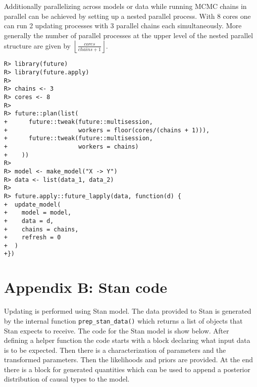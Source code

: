 \documentclass[
  11pt,
  article]{jss}
\begin{document}
Additionally parallelizing across models or data while running MCMC
chains in parallel can be achieved by setting up a nested parallel
process. With 8 cores one can run 2 updating processes with 3 parallel
chains each simultaneously. More generally the number of parallel
processes at the upper level of the nested parallel structure are given
by \(\left \lfloor \frac{cores}{chains + 1} \right \rfloor\).

\begin{verbatim}
R> library(future)
R> library(future.apply)
R> 
R> chains <- 3
R> cores <- 8
R> 
R> future::plan(list(
+      future::tweak(future::multisession, 
+                    workers = floor(cores/(chains + 1))),
+      future::tweak(future::multisession, 
+                    workers = chains)
+    ))
R> 
R> model <- make_model("X -> Y")
R> data <- list(data_1, data_2)
R> 
R> future.apply::future_lapply(data, function(d) {
+  update_model(
+    model = model,
+    data = d,
+    chains = chains,
+    refresh = 0
+  )
+})
\end{verbatim}

\hypertarget{sec-stancode}{%
\section*{Appendix B: Stan code}\label{sec-stancode}}

Updating is performed using Stan model. The data provided to Stan is
generated by the internal function \texttt{prep\_stan\_data()} which
returns a list of objects that Stan expects to receive. The code for the
Stan model is show below. After defining a helper function the code
starts with a block declaring what input data is to be expected. Then
there is a characterization of parameters and the transformed
parameters. Then the likelihoods and priors are provided. At the end
there is a block for generated quantities which can be used to append a
posterior distribution of causal types to the model.
\end{document}
